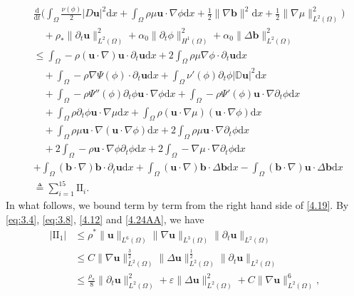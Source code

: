 \documentclass[11pt]{article}
\numberwithin{equation}{section}
\begin{document}
\begin{equation}
\begin{split}\label{4.19}
&\frac{\mathrm{d}}{\mathrm{d}t}\Big(\int_{\Omega}\frac{\nu(\phi)}{2}
|D\mathbf{u}|^2\mathrm{d}x+\int_{\Omega}\rho\mu\mathbf{u}\cdot
\nabla\phi\mathrm{d}x+\frac{1}{2}\|\nabla\mathbf{b}\|^2\mathrm{d}x
+\frac{1}{2}\|\nabla\mu\|_{L^2(\Omega)}^2\Big)\\
&\quad+\rho_*\|\partial_t\mathbf{u}\|_{L^2(\Omega)}^2
+\alpha_0\|\partial_t\phi\|_{H^1(\Omega)}^2 +
\alpha_0\|\Delta\mathbf{b}\|_{L^2(\Omega)}^2\\
&\leq \int_{\Omega}-\rho(\mathbf{u}\cdot\nabla)\mathbf{u}
\cdot\partial_t\mathbf{u}\mathrm{d}x
+2\int_{\Omega}\rho\mu\nabla\phi\cdot\partial_t\mathbf{u}
\mathrm{d}x\\
&\quad+\int_{\Omega}-\rho\nabla\Psi(\phi)\cdot\partial_t
\mathbf{u}\mathrm{d}x+\int_{\Omega}\nu'(\phi)
\partial_t\phi|\mathbb{D}\mathbf{u}|^2\mathrm{d}x \\
&\quad+\int_{\Omega}-\rho\Psi''(\phi)\partial_t\phi
\mathbf{u}\cdot\nabla\phi\mathrm{d}x+\int_{\Omega}
-\rho\Psi'(\phi)\mathbf{u}\cdot\nabla\partial_t\phi\mathrm{d}x \\
&\quad+\int_{\Omega}\rho\partial_t\phi
\mathbf{u}\cdot\nabla\mu\mathrm{d}x+\int_{\Omega}\rho
(\mathbf{u}\cdot\nabla\mu)(\mathbf{u}\cdot\nabla\phi)\mathrm{d}x \\
&\quad+\int_{\Omega}\rho\mu\mathbf{u}
\cdot\nabla(\mathbf{u}\cdot\nabla\phi)\mathrm{d}x+2\int_{\Omega}\rho\mu\mathbf{u}\cdot\nabla\partial_t\phi\mathrm{d}x\\
&\quad+2\int_{\Omega}-\rho\mathbf{u}\cdot\nabla\phi\partial_t
\phi\mathrm{d}x+2\int_{\Omega}-\nabla\mu
\cdot\nabla\partial_t\phi\mathrm{d}x \\
&+\int_{\Omega}(\mathbf{b}\cdot\nabla)\mathbf{b}\cdot\partial_t
\mathbf{u}\mathrm{d}x
+\int_{\Omega}(\mathbf{u}\cdot\nabla)\mathbf{b}\cdot\Delta
\mathbf{b}\mathrm{d}x
-\int_{\Omega}(\mathbf{b}\cdot\nabla)\mathbf{u}\cdot
\Delta\mathbf{b}\mathrm{d}x\\&\triangleq\sum_{i=1}^{15} \text{II}_i.
\end{split}
\end{equation}
In what follows, we  bound term by term  from the right hand side of \eqref{4.19}. By \eqref{eq:3.4}, \eqref{eq:3.8}, \eqref{4.12} and \eqref{4.24AA}, we have
\begin{equation}\label{4.25}
\begin{split}
|\text{II}_1|&\leq \rho^*\|\mathbf{u}\|_{L^6(\Omega)}\|\nabla\mathbf{u}\|_{L^3(\Omega)}
\|\partial_t\mathbf{u}\|_{L^2(\Omega)} \\
&\leq C\|\nabla\mathbf{u}\|_{L^2(\Omega)}^{\frac{3}{2}}\|\Delta
\mathbf{u}\|_{L^2(\Omega)}^{\frac{1}{2}}\|\partial_t\mathbf{u}\|_{L^2(\Omega)}\\
&\leq \frac{\rho_*}{8}\|\partial_t\mathbf{u}\|_{L^2(\Omega)}^2
+\varepsilon\|\Delta\mathbf{u}\|_{L^2(\Omega)}^2 + C\|\nabla\mathbf{u}\|_{L^2(\Omega)}^6,
\end{split}
\end{equation}
\end{document}
